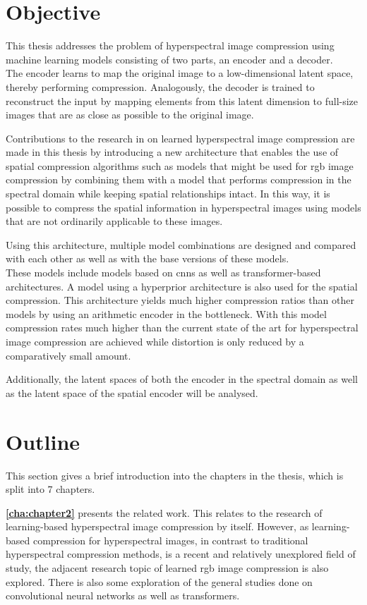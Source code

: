 \section{Objective\label{sec:objective}}
This thesis addresses the problem of hyperspectral image compression using machine learning models consisting of two parts, an encoder and a decoder.\\
The encoder learns to map the original image to a low-dimensional latent space, thereby performing compression. Analogously, the decoder is trained to reconstruct the input by mapping elements from this latent dimension to full-size images that are as close as possible to the original image.

Contributions to the research in on learned hyperspectral image compression are made in this thesis by introducing a new architecture that enables the use of spatial compression algorithms such as models that might be used for \ac{rgb} image compression by combining them with a model that performs compression in the spectral domain while keeping spatial relationships intact. In this way, it is possible to compress the spatial information in hyperspectral images using models that are not ordinarily applicable to these images.

Using this architecture, multiple model combinations are designed and compared with each other as well as with the base versions of these models.\\
These models include models based on \acp{cnn} as well as transformer-based architectures.
A model using a hyperprior architecture is also used for the spatial compression. This architecture yields much higher compression ratios than other models by using an arithmetic encoder in the bottleneck. With this model compression rates much higher than the current state of the art for hyperspectral image compression are achieved while distortion is only reduced by a comparatively small amount. 

Additionally, the latent spaces of both the encoder in the spectral domain as well as the latent space of the spatial encoder will be analysed.

\section{Outline\label{sec:outline}}
This section gives a brief introduction into the chapters in the thesis, which is split into 7 chapters.

\textbf{\autoref{cha:chapter2}} presents the related work. This relates to the research of learning-based hyperspectral image compression by itself. However, as learning-based compression for hyperspectral images, in contrast to traditional hyperspectral compression methods, is a recent and relatively unexplored field of study, the adjacent research topic of learned \ac{rgb} image compression is also explored. There is also some exploration of the general studies done on convolutional neural networks as well as transformers.

